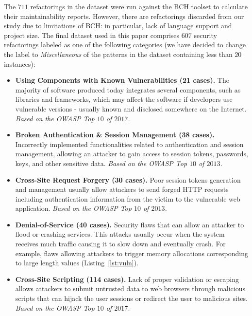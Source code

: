 \documentclass[sigconf,review]{acmart}
\begin{document}
The $711$ refactorings in the dataset were run against the BCH toolset to
calculate their maintainability reports. However, there are refactorings
discarded from our study due to limitations of BCH: in particular, lack of
language support and project size. The final dataset used in this paper comprises
$607$ security refactorings labeled as one of the following categories (we
have decided to change the label to \textit{Miscellaneous} of the patterns in
the dataset containing less than $20$ instances):

\begin{itemize}
    \item \textbf{Using Components with Known Vulnerabilities (21 cases).} The majority of
    software produced today integrates several components, such as libraries and
    frameworks, which may affect the software if developers use vulnerable
    versions - usually known and disclosed somewhere on the Internet.
    \textit{Based on the OWASP Top $10$ of $2017$.}

    \item \textbf{Broken Authentication \& Session Management (38 cases).} Incorrectly
    implemented functionalities related to authentication and session
    management, allowing an attacker to gain access to session tokens,
    passwords, keys, and other sensitive data. \textit{Based on the OWASP Top
    $10$ of $2013$.}

    \item \textbf{Cross-Site Request Forgery (30 cases).} Poor session tokens generation
    and management usually allow attackers to send forged HTTP requests
    including authentication information from the victim to the vulnerable web
    application. \textit{Based on the OWASP Top $10$ of $2013$.}

    \item \textbf{Denial-of-Service (40 cases).} Security flaws that can allow an attacker
    to flood or crashing services. This attacks usually occur when the system
    receives much traffic causing it to slow down and eventually crash. For
    example, flaws allowing attackers to trigger memory allocations
    corresponding to large length values (Listing~\ref{lst:vuln}).

    \item \textbf{Cross-Site Scripting (114 cases).} Lack of proper validation or escaping
    allows attackers to submit untrusted data to web browsers through malicious
    scripts that can hijack the user sessions or redirect the user to malicious
    sites. \textit{Based on the OWASP Top $10$ of $2017$.}


\end{itemize}
\end{document}
